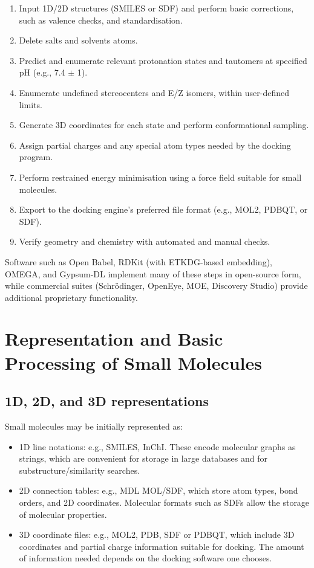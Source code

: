 \documentclass[12pt]{article}
\begin{document}
\begin{enumerate}
  \item Input 1D/2D structures (SMILES or SDF) and perform basic corrections, such as valence checks, and standardisation.
  \item Delete salts and solvents atoms.
  \item Predict and enumerate relevant protonation states and tautomers at specified pH (e.g., 7.4 \(\pm\) 1).
  \item Enumerate undefined stereocenters and E/Z isomers, within user-defined limits.
  \item Generate 3D coordinates for each state and perform conformational sampling.
  \item Assign partial charges and any special atom types needed by the docking program.
  \item Perform restrained energy minimisation using a force field suitable for small molecules.
  \item Export to the docking engine's preferred file format (e.g., MOL2, PDBQT, or SDF).
  \item Verify geometry and chemistry with automated and manual checks.
\end{enumerate}

Software such as Open Babel\cite{CH6_OBoyle2011}, RDKit (with ETKDG-based embedding)\cite{CH6_Riniker2015}, OMEGA\cite{CH6_Hawkins2010}, and Gypsum-DL\cite{CH6_Ropp2019} implement many of these steps in open-source form, while commercial suites (Schr\"odinger, OpenEye, MOE, Discovery Studio) provide additional proprietary functionality.

\section{Representation and Basic Processing of Small Molecules}

\subsection{1D, 2D, and 3D representations}

Small molecules may be initially represented as:
\begin{itemize}
  \item 1D line notations: e.g., SMILES\cite{CH6_Weininger1988}, InChI\cite{CH6_Heller2013}. These encode molecular graphs as strings, which are convenient for storage in large databases and for substructure/similarity searches.
  \item 2D connection tables: e.g., MDL MOL/SDF, which store atom types, bond orders, and 2D coordinates. Molecular formats such as SDFs allow the storage of molecular properties.
  \item 3D coordinate files: e.g., MOL2, PDB, SDF or PDBQT, which include 3D coordinates and partial charge information suitable for docking. The amount of information needed depends on the docking software one chooses.
\end{itemize}
\end{document}
